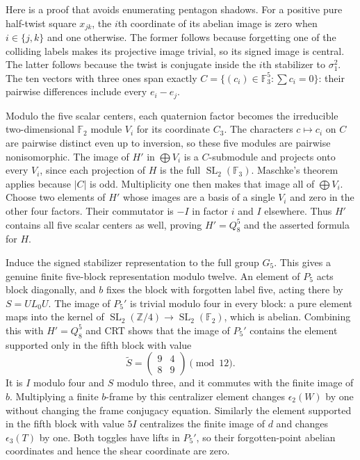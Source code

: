 Here is a proof that avoids enumerating pentagon shadows. For a positive
pure half-twist square $x_{jk}$, the $i$th coordinate of its abelian image
is zero when $i\in\{j,k\}$ and one otherwise. The former follows because
forgetting one of the colliding labels makes its projective image trivial,
so its signed image is central. The latter follows because the twist is
conjugate inside the $i$th stabilizer to $\sigma_1^2$.
The ten vectors with three ones span exactly
$C=\{(c_i)\in\mathbb F_3^5:\sum c_i=0\}$: their pairwise differences
include every $e_i-e_j$.

Modulo the five scalar centers, each quaternion factor becomes the
irreducible two-dimensional $\mathbb F_2$ module $V_i$ for its coordinate
$C_3$. The characters $c\mapsto c_i$ on $C$ are pairwise distinct even
up to inversion, so these five modules are pairwise nonisomorphic.
The image of $H'$ in $\bigoplus V_i$ is a $C$-submodule and projects onto
every $V_i$, since each projection of $H$ is the full
$\operatorname{SL}_2(\mathbb F_3)$. Maschke's theorem applies because
$|C|$ is odd. Multiplicity one then makes that image all of
$\bigoplus V_i$. Choose two elements of $H'$ whose images are a basis
of a single $V_i$ and zero in the other four factors. Their commutator is
$-I$ in factor $i$ and $I$ elsewhere. Thus $H'$ contains all five scalar
centers as well, proving $H'=Q_8^5$ and the asserted formula for $H$.

Induce the signed stabilizer representation to the full group $G_5$.
This gives a genuine finite five-block representation modulo twelve.
An element of $P_5$ acts block diagonally, and $b$ fixes the block with
forgotten label five, acting there by $S=UL_0U$.
The image of $P_5'$ is trivial modulo four in every block: a pure element
maps into the kernel of
$\operatorname{SL}_2(\mathbb Z/4)\to\operatorname{SL}_2(\mathbb F_2)$,
which is abelian. Combining this with $H'=Q_8^5$ and CRT shows that the
image of $P_5'$ contains the element supported only in the fifth block
with value
\[
 \widetilde S=\begin{pmatrix}9&4\\8&9\end{pmatrix}\pmod{12}.
\]
It is $I$ modulo four and $S$ modulo three, and it commutes with the
finite image of $b$. Multiplying a finite $b$-frame by this centralizer
element changes $\epsilon_2(W)$ by one without changing the frame
conjugacy equation. Similarly the element supported in the fifth block
with value $5I$ centralizes the finite image of $d$ and changes
$\epsilon_3(T)$ by one. Both toggles have lifts in $P_5'$, so their
forgotten-point abelian coordinates and hence the shear coordinate are
zero.

